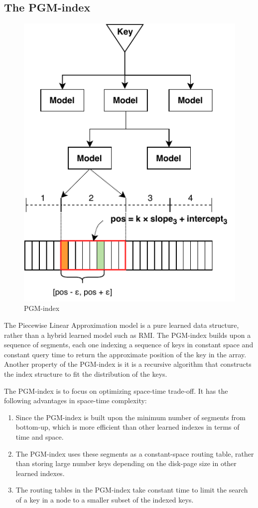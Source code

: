 \subsection{The PGM-index}

\begin{figure}[ht]
\centering
\includegraphics[scale=1]{Figures/pgm.pdf}
\caption{PGM-index}
\label{fig:pgm}
\end{figure}

The Piecewise Linear Approximation model \cite{Ferragina:ud} is a pure learned data structure, rather than a hybrid learned model such as RMI. The PGM-index builds upon a sequence of segments, each one indexing a sequence of keys in constant space and constant query time to return the approximate position of the key in the array. Another property of the PGM-index is it is a recursive algorithm that constructs the index structure to fit the distribution of the keys. 

The PGM-index is to focus on optimizing space-time trade-off. It has the following advantages in space-time complexity:

\begin{enumerate}
    \item Since the PGM-index is built upon the minimum number of segments from bottom-up, which is more efficient than other learned indexes in terms of time and space. 
    \item The PGM-index uses these segments as a constant-space routing table, rather than storing large number keys depending on the disk-page size in other learned indexes. 
    \item The routing tables in the PGM-index take constant time to limit the search of a key in a node to a smaller subset of the indexed keys.
\end{enumerate}

